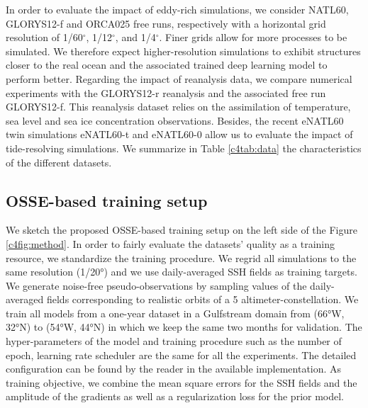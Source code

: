 \begin{bibunit}
In order to evaluate the impact of eddy-rich simulations, we consider NATL60, GLORYS12-f and ORCA025 free runs, respectively with a horizontal grid resolution of 1/60$^\circ$, 1/12$^\circ$, and 1/4$^\circ$. Finer grids allow for more processes to be simulated. We therefore expect higher-resolution simulations to exhibit structures closer to the real ocean and the associated trained deep learning model to perform better.
Regarding the impact of reanalysis data, we compare numerical experiments with the GLORYS12-r reanalysis and the associated free run GLORYS12-f. This reanalysis dataset relies on the assimilation of temperature, sea level and sea ice concentration observations. 
Besides, the recent eNATL60 twin simulations eNATL60-t and eNATL60-0 allow us to evaluate the impact of tide-resolving simulations.
We summarize in Table \ref{c4tab:data} the characteristics of the different datasets. 

\subsection*{OSSE-based training setup}
\label{c4ssec:training}
We sketch the proposed OSSE-based training setup on the left side of the Figure \ref{c4fig:method}.
In order to fairly evaluate the datasets' quality as a training resource, we standardize the training procedure.
We regrid all simulations to the same resolution (1/20°) and we use daily-averaged SSH fields as training targets. We generate noise-free pseudo-observations by sampling values of the daily-averaged fields corresponding to realistic orbits of a 5 altimeter-constellation. We train all models from a one-year dataset in a Gulfstream domain from (66°W, 32°N) to (54°W, 44°N) in which we keep the same two months for validation. The hyper-parameters of the model and training procedure such as the number of epoch, learning rate scheduler are the same for all the experiments. The detailed configuration can be found by the reader in the available implementation. As training objective, we combine the mean square errors for the SSH fields and the amplitude of the gradients as well as a regularization loss for the prior model.


\end{bibunit}
